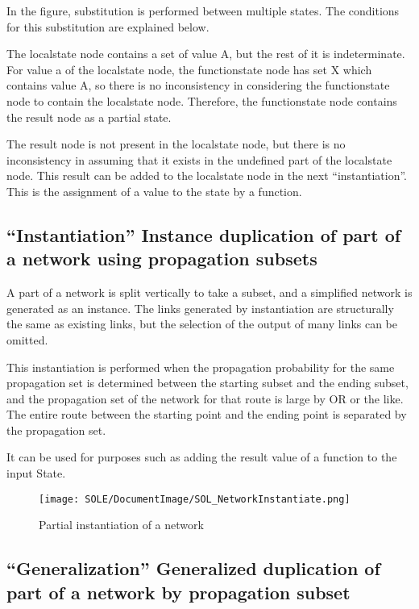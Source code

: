 \documentclass[12pt]{article}
\begin{document}
In the figure, substitution is performed between multiple states. The
conditions for this substitution are explained below.

The localstate node contains a set of value A, but the rest of it is
indeterminate. For value a of the localstate node, the functionstate
node has set X which contains value A, so there is no inconsistency in
considering the functionstate node to contain the localstate node.
Therefore, the functionstate node contains the result node as a partial
state.

The result node is not present in the localstate node, but there is no
inconsistency in assuming that it exists in the undefined part of the
localstate node. This result can be added to the localstate node in the
next ``instantiation''. This is the assignment of a value to the state
by a function.

\subsection{``Instantiation'' Instance duplication of part of a
network using propagation
subsets}\label{instantiation-instance-duplication-of-part-of-a-network-using-propagation-subsets}

A part of a network is split vertically to take a subset, and a
simplified network is generated as an instance. The links generated by
instantiation are structurally the same as existing links, but the
selection of the output of many links can be omitted.

This instantiation is performed when the propagation probability for the
same propagation set is determined between the starting subset and the
ending subset, and the propagation set of the network for that route is
large by OR or the like. The entire route between the starting point and
the ending point is separated by the propagation set.

It can be used for purposes such as adding the result value of a
function to the input State.

\begin{figure}[ht]
  \centering
  \texttt{[image: SOLE/DocumentImage/SOL\_NetworkInstantiate.png]}
  \caption{Partial instantiation of a network}
  \label{fig:partial_instantiation_of_a_network}
\end{figure}

\subsection{``Generalization'' Generalized duplication of part of a
network by propagation
subset}\label{generalization-generalized-duplication-of-part-of-a-network-by-propagation-subset}
\end{document}
